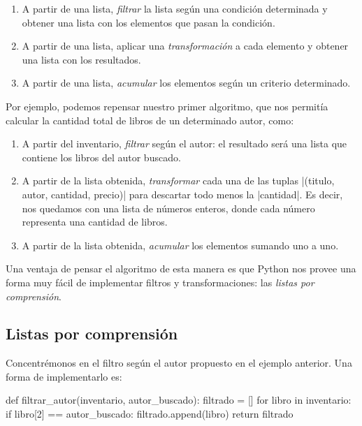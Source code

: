 \begin{subappendices}
\begin{enumerate}
    \item A partir de una lista, \emph{filtrar} la lista según una condición
        determinada y obtener una lista con los elementos que pasan la
        condición.
    \item A partir de una lista, aplicar una \emph{transformación} a cada elemento
        y obtener una lista con los resultados.
    \item A partir de una lista, \emph{acumular} los elementos según un
        criterio determinado.
\end{enumerate}


Por ejemplo, podemos repensar nuestro primer algoritmo, que nos permitía calcular
la cantidad total de libros de un determinado autor, como:

\begin{enumerate}
    \item A partir del inventario, \emph{filtrar} según el autor:
        el resultado será una lista que contiene los libros del autor buscado.
    \item A partir de la lista obtenida, \emph{transformar} cada una de las tuplas
        |(titulo, autor, cantidad, precio)| para descartar todo menos la
        |cantidad|. Es decir, nos quedamos con una lista de números
        enteros, donde cada número representa una cantidad de libros.
    \item A partir de la lista obtenida, \emph{acumular} los elementos sumando uno
        a uno.
\end{enumerate}

Una ventaja de pensar el algoritmo de esta manera es que Python nos provee una
forma muy fácil de implementar filtros y transformaciones: las \emph{listas por
comprensión}.

\subsection{Listas por comprensión}

Concentrémonos en el filtro según el autor propuesto en el ejemplo anterior.
Una forma de implementarlo es:

\begin{codigo-python-sn}
def filtrar_autor(inventario, autor_buscado):
    filtrado = []
    for libro in inventario:
        if libro[2] == autor_buscado:
            filtrado.append(libro)
    return filtrado
\end{codigo-python-sn}


\end{subappendices}
